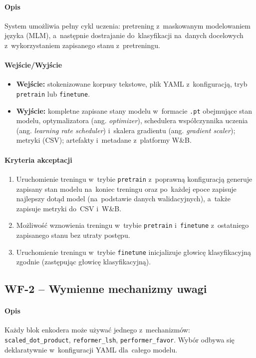 \documentclass[a4paper,11pt,twoside]{report}
\theoremstyle{definition}
\begin{document}
\paragraph{Opis} System umożliwia pełny cykl uczenia: pretrening z~maskowanym modelowaniem języka (MLM), a~następnie dostrajanie do~klasyfikacji na~danych docelowych z~wykorzystaniem zapisanego stanu z~pretreningu.

\paragraph{Wejście/Wyjście}
\begin{itemize}
  \item \textbf{Wejście:} stokenizowane korpusy tekstowe, plik YAML z~konfiguracją, tryb \texttt{pretrain} lub \texttt{finetune}.
  \item \textbf{Wyjście:} kompletne zapisane stany modelu w~formacie \texttt{.pt} obejmujące stan modelu, optymalizatora (ang. \emph{optimizer}), schedulera współczynnika uczenia (ang. \emph{learning rate scheduler}) i~skalera gradientu (ang. \emph{gradient scaler}); metryki (CSV); artefakty i~metadane z~platformy W\&B.
\end{itemize}

\paragraph{Kryteria akceptacji}
\begin{enumerate}
  \item Uruchomienie treningu w~trybie \texttt{pretrain} z~poprawną konfiguracją generuje zapisany stan modelu na~koniec treningu oraz po~każdej epoce zapisuje najlepszy dotąd model (na~podstawie danych walidacyjnych), a~także zapisuje metryki do~CSV i~W\&B.
  \item Możliwość wznowienia treningu w~trybie \texttt{pretrain} i~\texttt{finetune} z~ostatniego zapisanego stanu bez utraty postępu.
  \item Uruchomienie treningu w~trybie \texttt{finetune} inicjalizuje głowicę klasyfikacyjną zgodnie (zastępując głowicę klasyfikacyjną).

\end{enumerate}

\subsection{WF-2 -- Wymienne mechanizmy uwagi}
\paragraph{Opis} Każdy blok enkodera może używać jednego z~mechanizmów: \texttt{scaled\_dot\_product}, \texttt{reformer\_lsh}, \texttt{performer\_favor}. Wybór odbywa się deklaratywnie w~konfiguracji YAML dla~całego modelu.
\end{document}
